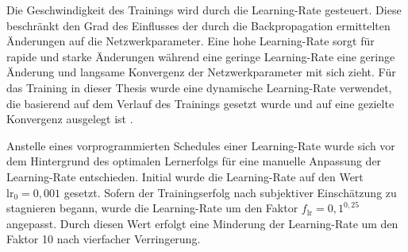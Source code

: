 Die Geschwindigkeit des Trainings wird durch die Learning-Rate gesteuert. Diese beschränkt den Grad des Einflusses der durch die Backpropagation ermittelten Änderungen auf die Netzwerkparameter. Eine hohe Learning-Rate sorgt für rapide und starke Änderungen während eine geringe Learning-Rate eine geringe Änderung und langsame Konvergenz der Netzwerkparameter mit sich zieht. Für das Training in dieser Thesis wurde eine dynamische Learning-Rate verwendet, die basierend auf dem Verlauf des Trainings gesetzt wurde und auf eine gezielte Konvergenz ausgelegt ist \cite{adaptive_lr_schedule}.

Anstelle eines vorprogrammierten Schedules einer Learning-Rate wurde sich vor dem Hintergrund des optimalen Lernerfolgs für eine manuelle Anpassung der Learning-Rate entschieden. Initial wurde die Learning-Rate auf den Wert $\text{lr}_0 = 0,\!001$ gesetzt. Sofern der Trainingserfolg nach subjektiver Einschätzung zu stagnieren begann, wurde die Learning-Rate um den Faktor $f_\text{lr} = 0,\!1^{0,25}$ angepasst. Durch diesen Wert erfolgt eine Minderung der Learning-Rate um den Faktor 10 nach vierfacher Verringerung.



